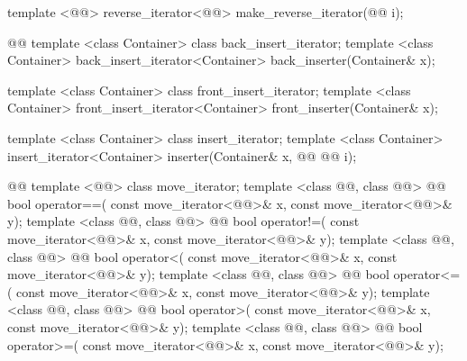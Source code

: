 \begin{codeblock}
  template <@@>
    reverse_iterator<@@> make_reverse_iterator(@@ i);

  @@
  template <class Container> class back_insert_iterator;
  template <class Container>
    back_insert_iterator<Container> back_inserter(Container& x);

  template <class Container> class front_insert_iterator;
  template <class Container>
    front_insert_iterator<Container> front_inserter(Container& x);

  template <class Container> class insert_iterator;
  template <class Container>
    insert_iterator<Container> inserter(Container& x, @@
      @@ i);

  @@
  template <@@> class move_iterator;
  template <class @@, class @@>
      @@
    bool operator==(
      const move_iterator<@@>& x, const move_iterator<@@>& y);
  template <class @@, class @@>
      @@
    bool operator!=(
      const move_iterator<@@>& x, const move_iterator<@@>& y);
  template <class @@, class @@>
      @@
    bool operator<(
      const move_iterator<@@>& x, const move_iterator<@@>& y);
  template <class @@, class @@>
      @@
    bool operator<=(
      const move_iterator<@@>& x, const move_iterator<@@>& y);
  template <class @@, class @@>
      @@
    bool operator>(
      const move_iterator<@@>& x, const move_iterator<@@>& y);
  template <class @@, class @@>
      @@
    bool operator>=(
      const move_iterator<@@>& x, const move_iterator<@@>& y);


\end{codeblock}
